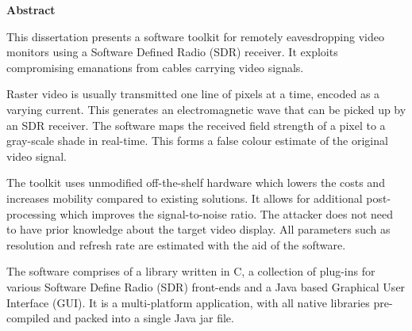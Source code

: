 \newpage
{\Huge \bf Abstract}
\vspace{24pt} 


This dissertation presents a software toolkit for remotely eavesdropping video monitors using a Software Defined Radio (SDR) receiver. It exploits compromising emanations from cables carrying video signals.

Raster video is usually transmitted one line of pixels at a time, encoded as a varying current. This generates an electromagnetic wave that can be picked up by an SDR receiver. The software maps the received field strength of a pixel to a gray-scale shade in real-time. This forms a false colour estimate of the original video signal.

The toolkit uses unmodified off-the-shelf hardware which lowers the costs and increases mobility compared to existing solutions. It allows for additional post-processing which improves the signal-to-noise ratio. The attacker does not need to have prior knowledge about the target video display. All parameters such as resolution and refresh rate are estimated with the aid of the software. 

The software comprises of a library written in C, a collection of plug-ins for various Software Define Radio (SDR) front-ends and a Java based Graphical User Interface (GUI). It is a multi-platform application, with all native libraries pre-compiled and packed into a single Java jar file.


\newpage
\vspace*{\fill}
